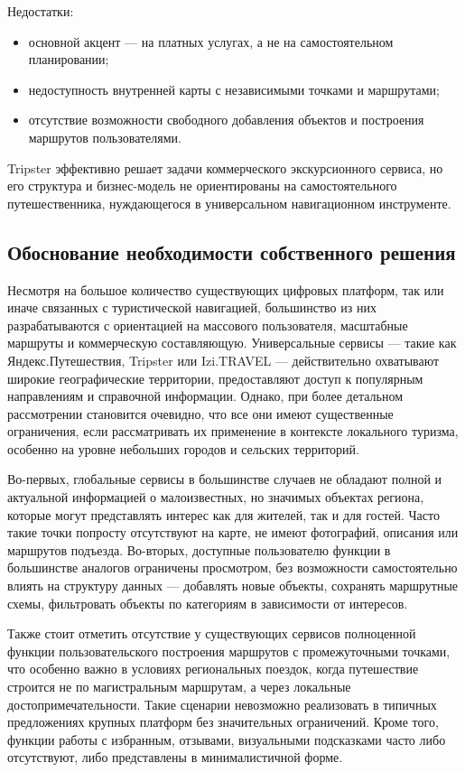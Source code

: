 Недостатки:
\begin{itemize}
	\item основной акцент — на платных услугах, а не на самостоятельном планировании;
	\item недоступность внутренней карты с независимыми точками и маршрутами;
	\item отсутствие возможности свободного добавления объектов и построения маршрутов пользователями.
\end{itemize}

Tripster эффективно решает задачи коммерческого экскурсионного сервиса, но его структура и бизнес-модель не ориентированы на самостоятельного путешественника, нуждающегося в универсальном навигационном инструменте.

\subsection{Обоснование необходимости собственного решения}

Несмотря на большое количество существующих цифровых платформ, так или иначе связанных с туристической навигацией, большинство из них разрабатываются с ориентацией на массового пользователя, масштабные маршруты и коммерческую составляющую. Универсальные сервисы — такие как Яндекс.Путешествия, Tripster или Izi.TRAVEL — действительно охватывают широкие географические территории, предоставляют доступ к популярным направлениям и справочной информации. Однако, при более детальном рассмотрении становится очевидно, что все они имеют существенные ограничения, если рассматривать их применение в контексте локального туризма, особенно на уровне небольших городов и сельских территорий.

Во-первых, глобальные сервисы в большинстве случаев не обладают полной и актуальной информацией о малоизвестных, но значимых объектах региона, которые могут представлять интерес как для жителей, так и для гостей. Часто такие точки попросту отсутствуют на карте, не имеют фотографий, описания или маршрутов подъезда. Во-вторых, доступные пользователю функции в большинстве аналогов ограничены просмотром, без возможности самостоятельно влиять на структуру данных — добавлять новые объекты, сохранять маршрутные схемы, фильтровать объекты по категориям в зависимости от интересов.

Также стоит отметить отсутствие у существующих сервисов полноценной функции пользовательского построения маршрутов с промежуточными точками, что особенно важно в условиях региональных поездок, когда путешествие строится не по магистральным маршрутам, а через локальные достопримечательности. Такие сценарии невозможно реализовать в типичных предложениях крупных платформ без значительных ограничений. Кроме того, функции работы с избранным, отзывами, визуальными подсказками часто либо отсутствуют, либо представлены в минималистичной форме.

